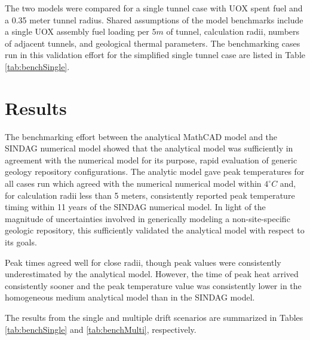 The two models were compared for a single tunnel case with UOX spent fuel and a 
0.35 meter tunnel radius. Shared assumptions of the model benchmarks include a 
single UOX assembly fuel loading per $5m$ of tunnel, calculation radii, numbers 
of adjacent tunnels, and geological thermal parameters. The benchmarking cases 
run in this validation effort for the simplified single 
tunnel case are listed in Table \ref{tab:benchSingle}. 


\section{Results}
The benchmarking effort between the analytical MathCAD model and the 
\gls{SINDAG} numerical  model showed that the analytical model was sufficiently 
in agreement with the numerical model for its purpose, rapid evaluation of 
generic geology repository configurations.  The analytic model gave peak 
temperatures for all cases run which agreed with the numerical numerical model 
within $4^{\circ}C$ and, for calculation radii less than 5 meters, consistently 
reported peak temperature timing within 11 years of the \gls{SINDAG} numerical 
model. In light of the magnitude of uncertainties involved in generically 
modeling a non-site-specific geologic repository, this sufficiently validated 
the analytical model with respect to its goals.

Peak times agreed well for close radii, though peak values were consistently 
underestimated by the analytical model. However, the time of peak heat arrived 
consistently sooner and the peak temperature value was consistently lower in the 
homogeneous medium analytical model than in the \gls{SINDAG} model. 

The results from the single and multiple drift scenarios are summarized in 
Tables \ref{tab:benchSingle} and \ref{tab:benchMulti}, respectively. 

